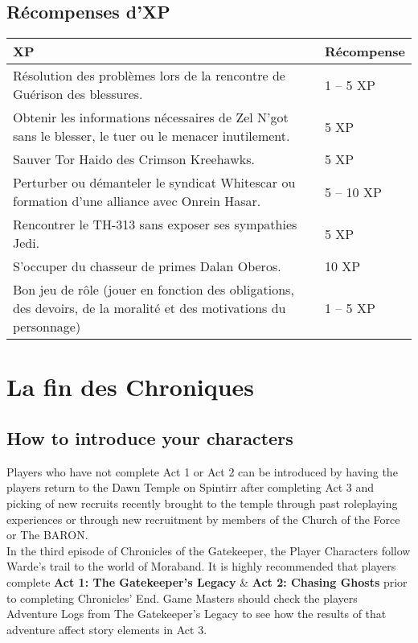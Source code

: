 \documentclass[twoside]{article}
\begin{document}
\subsection{Récompenses d'XP}
\begin{tabular}{|p{12cm}|p{4cm}|}
	\hline 
	\cellcolor{DarkRed} {\large \textcolor{PureWhite}{\textbf{XP}}} & \cellcolor{DarkRed} {\large \textcolor{PureWhite}{\textbf{Récompense}}} \\ 
	\hline 
	Résolution des problèmes lors de la rencontre de Guérison des blessures. & 1 -- 5 XP \\ 
	\hline 
	Obtenir les informations nécessaires de Zel N'got sans le blesser, le tuer ou le menacer inutilement. & 5 XP \\ 
	\hline 
	Sauver Tor Haido des Crimson Kreehawks. & 5 XP \\
	\hline 
	Perturber ou démanteler le syndicat Whitescar ou formation d'une alliance avec Onrein Hasar. & 5 -- 10 XP \\
	\hline 
	Rencontrer le TH-313 sans exposer ses sympathies Jedi. & 5 XP \\
	\hline 
	S'occuper du chasseur de primes Dalan Oberos. & 10 XP \\
	\hline 
	Bon jeu de rôle (jouer en fonction des obligations, des devoirs, de la moralité et des motivations du personnage) & 1 -- 5 XP \\
	\hline 
\end{tabular}


\section{La fin des Chroniques}
\subsection{How to introduce your characters}
Players who have not complete Act 1 or Act 2 can be introduced by having the players return to the Dawn Temple on Spintirr after completing Act 3 and picking of new recruits recently brought to the temple through past roleplaying experiences or through new recruitment by members of the Church of the Force or The BARON.\\

In the third episode of Chronicles of the Gatekeeper, the Player Characters follow Warde's trail to the world of Moraband.  It is highly recommended that players complete \textbf{Act 1: The Gatekeeper's Legacy} \& \textbf{Act 2: Chasing Ghosts} prior to completing Chronicles' End.  Game Masters should check the players Adventure Logs from The Gatekeeper's Legacy to see how the results of that adventure affect story elements in Act 3.\\
\end{document}
